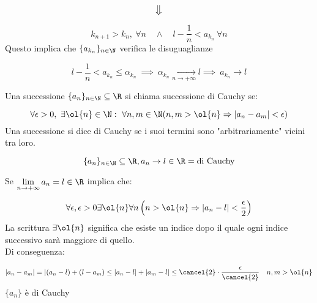 \documentclass[../appunti.tex]{subfiles}
\begin{document}
\begin{dimo}
\begin{equation*}
	\big\Downarrow
\end{equation*}

\begin{equation}
	k_{n+1} > k_n, \ \forall n \quad \land \quad 
	l - \frac{1}{n} < a_{k_n}\ \forall n
\end{equation}
Questo implica che $ \{ a_{k_n} \}_{n \in \N}$ verifica le disuguaglianze

\begin{equation}
	l - \frac{1}{n} < a_{k_n} \leq \alpha_{k_n}\ \implies\ 
	\alpha_{k_n} \underset{n \to + \infty}{\to} l \implies\
	a_{k_n} \to l
\end{equation}

\end{dimo}

\begin{defn}
	Una successione $ \{ a_n \}_{n \in \N} \subseteq \R $ si chiama successione di Cauchy se:

\begin{equation}
	\forall \epsilon > 0,\ \exists \ol{n} \in \N:\ \forall n,m \in \N 
	(n,m > \ol{n} \Rightarrow | a_n - a_m | < \epsilon )
\end{equation}
Una successione si dice di Cauchy se i suoi termini sono "arbitrariamente" vicini tra loro.
\end{defn}

\begin{defn}

\begin{equation}
	\{ a_n \}_{n \in \N} \subseteq \R, a_n \to l \in \R = \mbox{di Cauchy}
\end{equation}
\end{defn}

\begin{dimo} 
Se $ \lim \limits_{n \to + \infty} a_n = l \in \R $ implica che:

\begin{equation}
	\forall \epsilon, \epsilon > 0 \exists \ol{n} \forall n 
	\left( n > \ol{n} \Rightarrow | a_n - l | < \frac{\epsilon}{2} \right)
\end{equation}
La scrittura $ \exists \ol{n} $ significa che esiste un indice dopo il quale 
ogni indice successivo sarà maggiore di quello.\\
Di conseguenza:

\begin{equation}
	| a_n - a_m | = | (a_n - l) + (l - a_m) \leq 
	| a_n - l | + | a_m - l | \leq \cancel{2} \cdot \frac{\epsilon}{\cancel{2}}
	\quad n,m > \ol{n}
\end{equation}
$ \{ a_n \} $ è di Cauchy 
\end{dimo}
\end{document}
